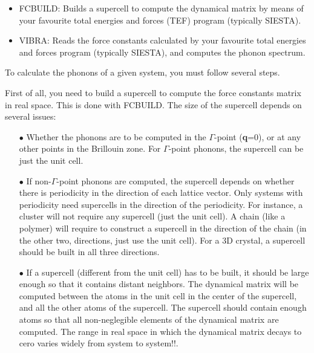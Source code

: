 \begin{itemize}
\item
FCBUILD:  Builds a supercell to compute the dynamical matrix 
by means of your favourite total energies and forces (TEF)
program (typically SIESTA).
\item
VIBRA:  Reads the force constants calculated
by your favourite total energies and forces
program (typically SIESTA), and computes the phonon spectrum.
\end{itemize}

\noindent
To calculate the phonons of a given system, you must follow
several steps. 

\noindent
First of all, you need to build a supercell
to compute the force constants matrix in real space.
This is done with FCBUILD.
The size of the supercell depends on several issues:

\begin{itemize}

\item[$\bullet$]  Whether  the phonons are to be
computed in the $\Gamma$-point ({\bf q}=0), or at any other
points in the Brillouin zone.
For $\Gamma$-point phonons, the supercell can be 
just the unit cell.

\item[$\bullet$]  If non-$\Gamma$-point phonons are computed,
the supercell depends on 
whether there is periodicity in the direction
of each lattice vector.  Only systems with periodicity need
supercells in the direction of the periodicity.
For instance, a cluster will not require any supercell (just the unit
cell). A chain (like a polymer) will require 
to construct a supercell in the direction of the chain
(in the other two, directions, just use the unit cell).
For a 3D crystal, a supercell should be built in all three
directions. 


\item[$\bullet$]  If a supercell (different from the unit cell)
has to be built,
it should be large enough so that it contains distant
neighbors. The dynamical matrix will be computed 
between the atoms in the unit cell in the center of
the supercell, and all the other atoms of the supercell. The
supercell should contain enough atoms so that all
non-neglegible elements of the dynamical matrix
are computed.   The range in real space in which
the dynamical matrix decays to cero varies widely
from system to system!!.

\end{itemize}

